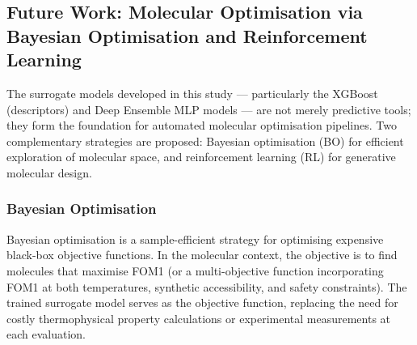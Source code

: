 \documentclass[11pt,a4paper]{article}
\begin{document}
\subsection{Future Work: Molecular Optimisation via Bayesian Optimisation and Reinforcement Learning}

The surrogate models developed in this study --- particularly the XGBoost (descriptors) and Deep Ensemble MLP models --- are not merely predictive tools; they form the foundation for automated molecular optimisation pipelines. Two complementary strategies are proposed: Bayesian optimisation (BO) for efficient exploration of molecular space, and reinforcement learning (RL) for generative molecular design.

\subsubsection{Bayesian Optimisation}

Bayesian optimisation is a sample-efficient strategy for optimising expensive black-box objective functions. In the molecular context, the objective is to find molecules that maximise FOM1 (or a multi-objective function incorporating FOM1 at both temperatures, synthetic accessibility, and safety constraints). The trained surrogate model serves as the objective function, replacing the need for costly thermophysical property calculations or experimental measurements at each evaluation.
\end{document}
